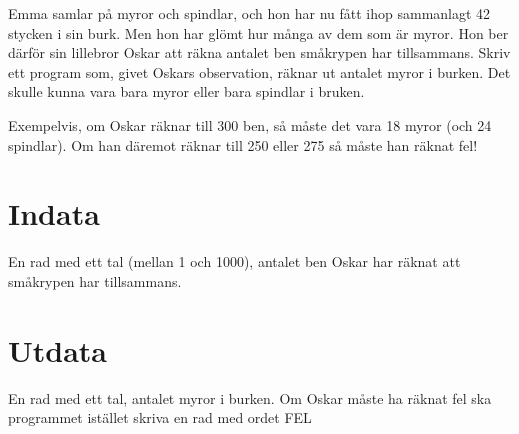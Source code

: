 
Emma samlar på myror och spindlar, och hon har nu fått ihop sammanlagt 42 stycken i sin burk. Men hon har glömt hur många av dem som är myror. Hon ber därför sin lillebror Oskar att räkna antalet ben småkrypen har tillsammans. Skriv ett program som, givet Oskars observation, räknar ut antalet myror i burken. Det skulle kunna vara bara myror eller bara spindlar i bruken.

Exempelvis, om Oskar räknar till 300 ben, så måste det vara 18 myror (och 24 spindlar). Om han däremot räknar till 250 eller 275 så måste han räknat fel!

\section*{Indata}
En rad med ett tal (mellan 1 och 1000), antalet ben Oskar har räknat att småkrypen har tillsammans.
\section*{Utdata}
En rad med ett tal, antalet myror i burken. Om Oskar måste ha räknat fel ska programmet istället skriva en rad med ordet FEL
